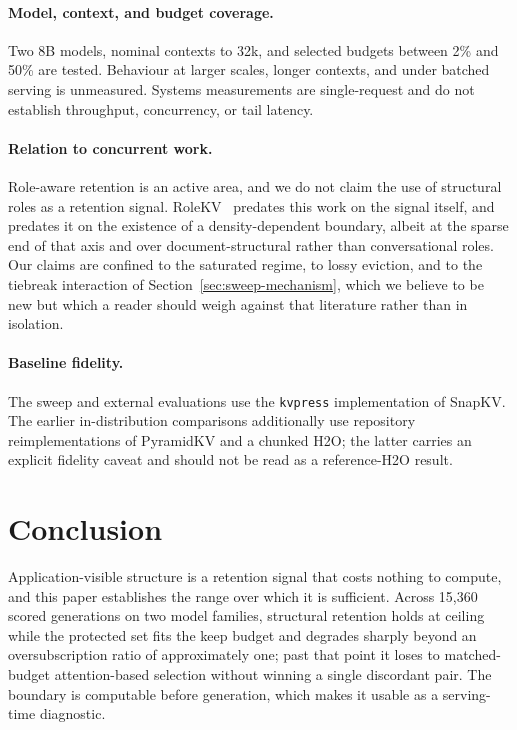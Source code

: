 \paragraph{Model, context, and budget coverage.}
Two 8B models, nominal contexts to 32k, and selected budgets between 2\% and
50\% are tested.  Behaviour at larger scales, longer contexts, and under batched
serving is unmeasured.  Systems measurements are single-request and do not
establish throughput, concurrency, or tail latency.

\paragraph{Relation to concurrent work.}
Role-aware retention is an active area, and we do not claim the use of
structural roles as a retention signal.  RoleKV~\cite{rolekv} predates this work
on the signal itself, and~\cite{structrolebias} predates it on the existence of
a density-dependent boundary, albeit at the sparse end of that axis and over
document-structural rather than conversational roles.  Our claims are confined
to the saturated regime, to lossy eviction, and to the tiebreak interaction of
Section~\ref{sec:sweep-mechanism}, which we believe to be new but which a reader
should weigh against that literature rather than in isolation.

\paragraph{Baseline fidelity.}
The sweep and external evaluations use the \texttt{kvpress} implementation of
SnapKV.  The earlier in-distribution comparisons additionally use repository
reimplementations of PyramidKV and a chunked H2O; the latter carries an explicit
fidelity caveat and should not be read as a reference-H2O result.

\section{Conclusion}
\label{sec:conclusion}

Application-visible structure is a retention signal that costs nothing to
compute, and this paper establishes the range over which it is sufficient.
Across 15{,}360 scored generations on two model families, structural retention
holds at ceiling while the protected set fits the keep budget and degrades
sharply beyond an oversubscription ratio of approximately one; past that point
it loses to matched-budget attention-based selection without winning a single
discordant pair.  The boundary is computable before generation, which makes it
usable as a serving-time diagnostic.

